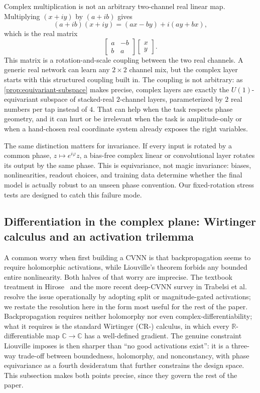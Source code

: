 \documentclass{article}
\providecommand{\Cref}[1]{\autoref{#1}}
\begin{document}
Complex multiplication is not an arbitrary two-channel real linear map.
Multiplying $(x+iy)$ by $(a+ib)$ gives
\[
  (a+ib)(x+iy) = (ax - by) + i(ay + bx),
\]
which is the real matrix
\[
  \begin{bmatrix} a & -b \\ b & a \end{bmatrix}
  \begin{bmatrix} x \\ y \end{bmatrix}.
\]
This matrix is a rotation-and-scale coupling between the two real
channels. A generic real network can learn any $2\times2$ channel mix,
but the complex layer starts with this structured coupling built in.
The coupling is not arbitrary: as
\Cref{prop:equivariant-subspace} makes precise, complex layers are
exactly the $U(1)$-equivariant subspace of stacked-real $2$-channel
layers, parameterized by $2$ real numbers per tap instead of $4$. That
can help when the task respects phase geometry, and it can hurt or be
irrelevant when the task is amplitude-only or when a hand-chosen real
coordinate system already exposes the right variables.

The same distinction matters for invariance. If every input is rotated
by a common phase, $z\mapsto e^{i\varphi}z$, a bias-free complex
linear or convolutional layer rotates its output by the same phase.
This is equivariance, not magic invariance: biases, nonlinearities,
readout choices, and training data determine whether the final model
is actually robust to an unseen phase convention. Our fixed-rotation
stress tests are designed to catch this failure mode.

\subsection{Differentiation in the complex plane: Wirtinger calculus and an activation trilemma}
\label{sec:wirtinger-trilemma}

A common worry when first building a CVNN is that backpropagation
seems to require holomorphic activations, while Liouville's theorem
forbids any bounded entire nonlinearity. Both halves of that worry are
imprecise. The textbook treatment in
Hirose~\cite{hirose2012complex} and the more recent deep-CVNN survey
in Trabelsi et al.~\cite{trabelsi2018deep} resolve the issue
operationally by adopting split or magnitude-gated activations; we
restate the resolution here in the form most useful for the rest of
the paper. Backpropagation requires neither holomorphy nor even
complex-differentiability; what it requires is the standard Wirtinger
(CR-) calculus, in which every $\mathbb{R}$-differentiable map
$\mathbb{C}\to\mathbb{C}$ has a well-defined gradient. The genuine
constraint Liouville imposes is then sharper than ``no good
activations exist'': it is a three-way trade-off between boundedness,
holomorphy, and nonconstancy, with phase equivariance as a fourth
desideratum that further constrains the design space. This subsection
makes both points precise, since they govern the rest of the paper.
\end{document}
